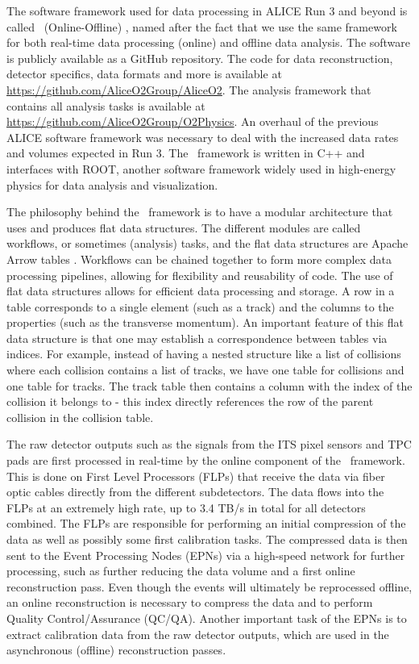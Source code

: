   The software framework used for data processing in ALICE Run 3 and beyond is called \otwo\ (Online-Offline) \cite{O2}, named after the fact that we use the same framework for both real-time data processing (online) and offline data analysis. The software is publicly available as a GitHub repository. The code for data reconstruction, detector specifics, data formats and more is available at \url{https://github.com/AliceO2Group/AliceO2}. The analysis framework that contains all analysis tasks is available at \url{https://github.com/AliceO2Group/O2Physics}. An overhaul of the previous ALICE software framework was necessary to deal with the increased data rates and volumes expected in Run 3. The \otwo\ framework is written in C++ and interfaces with ROOT, another software framework widely used in high-energy physics for data analysis and visualization. \cite{ROOT} 

  The philosophy behind the \otwo\ framework is to have a modular architecture that uses and produces flat data structures. The different modules are called workflows, or sometimes (analysis) tasks, and the flat data structures are Apache Arrow tables \cite{ApacheArrow}. Workflows can be chained together to form more complex data processing pipelines, allowing for flexibility and reusability of code. The use of flat data structures allows for efficient data processing and storage. A row in a table corresponds to a single element (such as a track) and the columns to the properties (such as the transverse momentum). An important feature of this flat data structure is that one may establish a correspondence between tables via indices. For example, instead of having a nested structure like a list of collisions where each collision contains a list of tracks, we have one table for collisions and one table for tracks. The track table then contains a column with the index of the collision it belongs to - this index directly references the row of the parent collision in the collision table. 

  The raw detector outputs such as the signals from the ITS pixel sensors and TPC pads are first processed in real-time by the online component of the \otwo\ framework. This is done on First Level Processors (FLPs) that receive the data via fiber optic cables directly from the different subdetectors. The data flows into the FLPs at an extremely high rate, up to 3.4 TB/s in total for all detectors combined. The FLPs are responsible for performing an initial compression of the data as well as possibly some first calibration tasks. The compressed data is then sent to the Event Processing Nodes (EPNs) via a high-speed network for further processing, such as further reducing the data volume and a first online reconstruction pass. Even though the events will ultimately be reprocessed offline, an online reconstruction is necessary to compress the data and to perform Quality Control/Assurance (QC/QA). Another important task of the EPNs is to extract calibration data from the raw detector outputs, which are used in the asynchronous (offline) reconstruction passes. 

